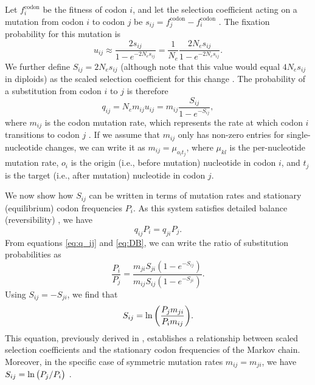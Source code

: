 \documentclass[11pt]{article}
\begin{document}
Let $f^\text{codon}_i$ be the fitness of codon $i$, and let the selection coefficient acting on a mutation from codon $i$ to codon $j$ be $s_{ij} = f^\text{codon}_j - f^\text{codon}_i$ \citep{SellaHirsh2005,YangNielsen2008}. The fixation probability for this mutation is \citep{Kimura1962,HalpernBruno1998}
\begin{equation}\label{eq:u_ij}
u_{ij} \approx \frac{2s_{ij}}{1 - e^{-2N_es_{ij}}} = \frac{1}{N_e}\frac{2N_es_{ij}}{1 - e^{-2N_es_{ij}}} .
\end{equation}
We further define $S_{ij} = 2N_es_{ij}$ (although note that this value would equal $4N_es_{ij}$ in diploids) as the scaled selection coefficient for this change \citep{YangNielsen2008}. The probability of a substitution from codon $i$ to $j$ is therefore
\begin{equation}\label{eq:q_ij}
q_{ij} = N_em_{ij}u_{ij} = m_{ij}\frac{S_{ij}}{1 - e^{-S_{ij}}} , 
\end{equation} where $m_{ij}$ is the codon mutation rate, which represents the rate at which codon $i$ transitions to codon $j$  \citep{HalpernBruno1998,SellaHirsh2005}. If we assume that $m_{ij}$ only has non-zero entries for single-nucleotide changes, we can write it as $m_{ij}=\mu_{o_it_j}$, where $\mu_{kl}$ is the per-nucleotide mutation rate, $o_i$ is the origin (i.e., before mutation) nucleotide in codon $i$, and $t_j$ is the target (i.e., after mutation) nucleotide in codon $j$.

We now show how $S_{ij}$ can be written in terms of mutation rates and stationary (equilibrium) codon frequencies $P_i$. As this system satisfies detailed balance (reversibility) \citep{HalpernBruno1998}, we have 
\begin{equation}\label{eq:DB}
q_{ij}P_i = q_{ji}P_j .
\end{equation} From equations \eqref{eq:q_ij} and \eqref{eq:DB}, we can write the ratio of substitution probabilities as 
\begin{equation}\label{ratio_q_ij}
\frac{P_i}{P_j} = \frac{m_{ji} S_{ji} (1-e^{-S_{ij}})} {m_{ij} S_{ij} (1-e^{-S_{ji}})} .
\end{equation} Using $S_{ij} = -S_{ji}$, we find that
\begin{equation}\label{eq:s_pmu}
S_{ij} = \ln\bigg{(} \frac{P_jm_{ji}}{P_im_{ij}} \bigg{)} .
\end{equation} This equation, previously derived in \citet{HalpernBruno1998}, establishes a relationship between scaled selection coefficients and the stationary codon frequencies of the Markov chain. Moreover, in the specific case of symmetric mutation rates $m_{ij} = m_{ji}$, we have $S_{ij} = \ln\big{(}P_j/P_i\big{)}$ \citep{SellaHirsh2005}. 
\end{document}
